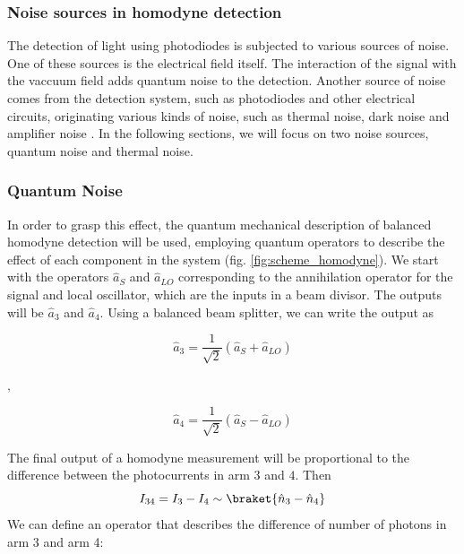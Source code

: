 \subsubsection{Noise sources in homodyne detection}
The detection of light using photodiodes is subjected to various sources of noise. One of these sources is the electrical field itself. The interaction of the signal with the vaccuum field adds quantum noise to the detection.
Another source of noise comes from the detection system, such as photodiodes and other electrical circuits, originating various kinds of noise, such as thermal noise, dark noise and amplifier noise
\cite{hans2004}.
In the following sections, we will focus on two noise sources, quantum noise and thermal noise.
%
%
%
\subsubsection{Quantum Noise}
In order to grasp this effect, the quantum mechanical description of balanced homodyne detection will be used, employing quantum operators to describe the effect of each component in the system (fig. \ref{fig:scheme_homodyne}). We start with the operators $\hat{a}_S$ and $\hat{a}_{LO}$ corresponding to the annihilation operator for the signal and local oscillator, which are the inputs in a beam divisor. The outputs will be $\hat{a}_3$ and $\hat{a}_4$.
Using a balanced beam splitter, we can write the output as
%
\begin{center}
	\begin{minipage}{48mm}
		\noindent
		\begin{equation}
			\hat{a}_3 = \frac{1}{\sqrt{2}} \left( \hat{a}_S + \hat{a}_{LO} \right)
		\end{equation}
	\end{minipage}
	$,\quad$
	\begin{minipage}{48mm}
		\noindent
		\begin{equation}
			\hat{a}_4 = \frac{1}{\sqrt{2}} \left( \hat{a}_S - \hat{a}_{LO} \right)
		\end{equation}
	\end{minipage}
\end{center}
%
The final output of a homodyne measurement will be proportional to the difference between the photocurrents in arm $3$ and $4$. Then
%
\begin{equation}
I_{34} = I_3 - I_4 \sim \braket{\hat{n}_3 - \hat{n}_4}
\end{equation}
%
We can define an operator that describes the difference of number of photons in arm 3 and arm 4:
